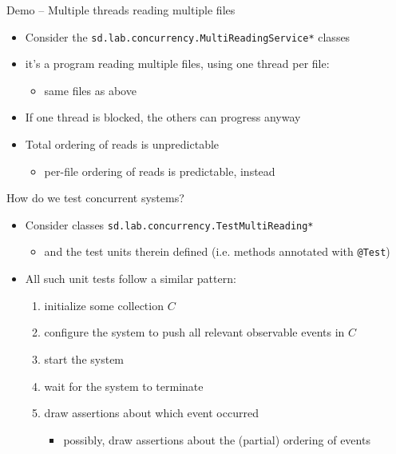 \documentclass[presentation]{beamer}\mode<presentation>{\usetheme{AMSBolognaFC}}
\begin{document}
\begin{frame}[allowframebreaks]
    \framebreak

    \startDemo
    \begin{exampleblock}{Demo \currentDemo{} -- Multiple threads reading multiple files}
        \begin{itemize}
            \item Consider the \texttt{sd.lab.concurrency.\alert{MultiReadingService}*} classes
            \item it's a program reading multiple files, using \alert{one thread per file}:
            \begin{itemize}
                \item same files as above
            \end{itemize}
            \item If one thread is blocked, the others can progress anyway
            \item Total ordering of reads is \alert{unpredictable}
            \begin{itemize}
                \item per-file ordering of reads is predictable, instead
            \end{itemize}
        \end{itemize}
    \end{exampleblock}

    \framebreak

    \begin{block}{How do we test concurrent systems?}
        \begin{itemize}
            \item Consider classes \texttt{sd.lab.concurrency.\alert{TestMultiReading}*}
            \begin{itemize}
                \item and the test units therein defined (i.e. methods annotated with \texttt{@Test})
            \end{itemize}
            \item All such unit tests follow a similar pattern:
            \begin{enumerate}
                \item initialize some collection $C$ 
                \item configure the system to push all relevant \alert{observable} events in $C$
                \item start the system
                \item wait for the system to terminate
                \item draw assertions about \alert{which} event occurred
                \begin{itemize}
                    \item possibly, draw assertions about the (partial) \alert{ordering} of events
                \end{itemize}
            \end{enumerate}
        \end{itemize}
    \end{block}


\end{frame}
\end{document}
